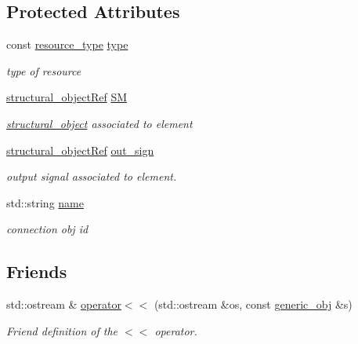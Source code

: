 \subsection*{Protected Attributes}
\begin{DoxyCompactItemize}
\item 
const \hyperlink{classgeneric__obj_a340b4a97256b423ea4a86bfdf201ec65}{resource\+\_\+type} \hyperlink{classgeneric__obj_aa9a48db33724bb3d62af38fabcf5f093}{type}
\begin{DoxyCompactList}\small\item\em type of resource \end{DoxyCompactList}\item 
\hyperlink{structural__objects_8hpp_a8ea5f8cc50ab8f4c31e2751074ff60b2}{structural\+\_\+object\+Ref} \hyperlink{classgeneric__obj_ab8a229dbf309fa9ef1b893db684a81ab}{SM}
\begin{DoxyCompactList}\small\item\em \hyperlink{classstructural__object}{structural\+\_\+object} associated to element \end{DoxyCompactList}\item 
\hyperlink{structural__objects_8hpp_a8ea5f8cc50ab8f4c31e2751074ff60b2}{structural\+\_\+object\+Ref} \hyperlink{classgeneric__obj_a89bc756ba7d468f622b65a5382f4f30c}{out\+\_\+sign}
\begin{DoxyCompactList}\small\item\em output signal associated to element. \end{DoxyCompactList}\item 
std\+::string \hyperlink{classgeneric__obj_afb35a4055929764e503d9d6b4689c039}{name}
\begin{DoxyCompactList}\small\item\em connection obj id \end{DoxyCompactList}\end{DoxyCompactItemize}
\subsection*{Friends}
\begin{DoxyCompactItemize}
\item 
std\+::ostream \& \hyperlink{classgeneric__obj_a1169edfd3843813c34f61af40199a5cd}{operator$<$$<$} (std\+::ostream \&os, const \hyperlink{classgeneric__obj}{generic\+\_\+obj} \&s)
\begin{DoxyCompactList}\small\item\em Friend definition of the $<$$<$ operator. \end{DoxyCompactList}\end{DoxyCompactItemize}


